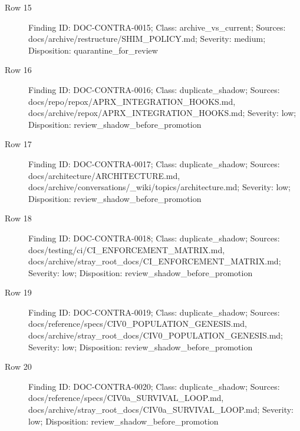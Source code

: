 \documentclass[9pt,a4paper]{book}
\begin{document}
\begin{description}
\item[Row 15] Finding ID: DOC-\allowbreak{}CONTRA-\allowbreak{}0015; Class: archive\_\allowbreak{}vs\_\allowbreak{}current; Sources: docs/\allowbreak{}archive/\allowbreak{}restructure/\allowbreak{}SHIM\_\allowbreak{}POLICY.\allowbreak{}md; Severity: medium; Disposition: quarantine\_\allowbreak{}for\_\allowbreak{}review
\item[Row 16] Finding ID: DOC-\allowbreak{}CONTRA-\allowbreak{}0016; Class: duplicate\_\allowbreak{}shadow; Sources: docs/\allowbreak{}repo/\allowbreak{}repox/\allowbreak{}APRX\_\allowbreak{}INTEGRATION\_\allowbreak{}HOOKS.\allowbreak{}md, docs/\allowbreak{}archive/\allowbreak{}repox/\allowbreak{}APRX\_\allowbreak{}INTEGRATION\_\allowbreak{}HOOKS.\allowbreak{}md; Severity: low; Disposition: review\_\allowbreak{}shadow\_\allowbreak{}before\_\allowbreak{}promotion
\item[Row 17] Finding ID: DOC-\allowbreak{}CONTRA-\allowbreak{}0017; Class: duplicate\_\allowbreak{}shadow; Sources: docs/\allowbreak{}architecture/\allowbreak{}ARCHITECTURE.\allowbreak{}md, docs/\allowbreak{}archive/\allowbreak{}conversations/\allowbreak{}\_\allowbreak{}wiki/\allowbreak{}topics/\allowbreak{}architecture.\allowbreak{}md; Severity: low; Disposition: review\_\allowbreak{}shadow\_\allowbreak{}before\_\allowbreak{}promotion
\item[Row 18] Finding ID: DOC-\allowbreak{}CONTRA-\allowbreak{}0018; Class: duplicate\_\allowbreak{}shadow; Sources: docs/\allowbreak{}testing/\allowbreak{}ci/\allowbreak{}CI\_\allowbreak{}ENFORCEMENT\_\allowbreak{}MATRIX.\allowbreak{}md, docs/\allowbreak{}archive/\allowbreak{}stray\_\allowbreak{}root\_\allowbreak{}docs/\allowbreak{}CI\_\allowbreak{}ENFORCEMENT\_\allowbreak{}MATRIX.\allowbreak{}md; Severity: low; Disposition: review\_\allowbreak{}shadow\_\allowbreak{}before\_\allowbreak{}promotion
\item[Row 19] Finding ID: DOC-\allowbreak{}CONTRA-\allowbreak{}0019; Class: duplicate\_\allowbreak{}shadow; Sources: docs/\allowbreak{}reference/\allowbreak{}specs/\allowbreak{}CIV0\_\allowbreak{}POPULATION\_\allowbreak{}GENESIS.\allowbreak{}md, docs/\allowbreak{}archive/\allowbreak{}stray\_\allowbreak{}root\_\allowbreak{}docs/\allowbreak{}CIV0\_\allowbreak{}POPULATION\_\allowbreak{}GENESIS.\allowbreak{}md; Severity: low; Disposition: review\_\allowbreak{}shadow\_\allowbreak{}before\_\allowbreak{}promotion
\item[Row 20] Finding ID: DOC-\allowbreak{}CONTRA-\allowbreak{}0020; Class: duplicate\_\allowbreak{}shadow; Sources: docs/\allowbreak{}reference/\allowbreak{}specs/\allowbreak{}CIV0a\_\allowbreak{}SURVIVAL\_\allowbreak{}LOOP.\allowbreak{}md, docs/\allowbreak{}archive/\allowbreak{}stray\_\allowbreak{}root\_\allowbreak{}docs/\allowbreak{}CIV0a\_\allowbreak{}SURVIVAL\_\allowbreak{}LOOP.\allowbreak{}md; Severity: low; Disposition: review\_\allowbreak{}shadow\_\allowbreak{}before\_\allowbreak{}promotion

\end{description}
\end{document}

